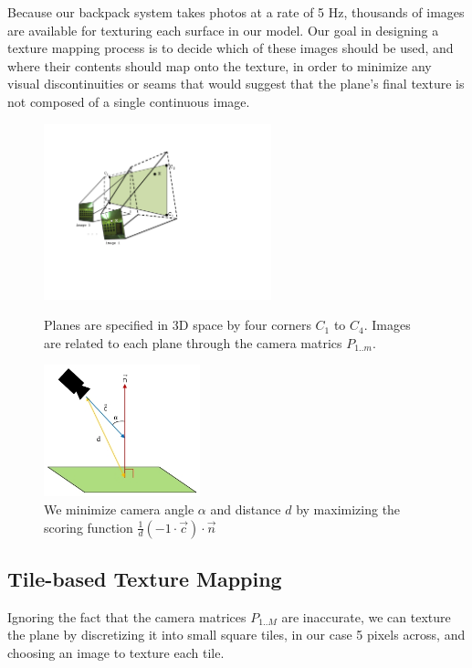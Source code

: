 \documentclass[]{spie}  %
\begin{document}
Because our backpack system takes photos at a rate of 5 Hz, thousands
of images are available for texturing each surface in our model. Our
goal in designing a texture mapping process is to decide which of
these images should be used, and where their contents should map onto
the texture, in order to minimize any visual discontinuities or seams
that would suggest that the plane's final texture is not composed of a
single continuous image.

\begin{figure}
  \begin{minipage}[b]{0.45\linewidth}
  \centering
  \includegraphics[height=2in]{Projection.pdf}
  \caption{Planes are specified in 3D space by four corners $C_1$ to
    $C_4$. Images are related to each plane through the camera matrics
    $P_{1..m}$. }
  \label{fig:projection}
  \end{minipage}
  \hspace{0.5cm}
  \begin{minipage}[b]{0.45\linewidth}
  \centering
  \includegraphics[height=1.5in]{scoringFunction.jpg}
  \caption{We minimize camera angle $\alpha$ and distance $d$ by
    maximizing the scoring function $\frac{1}{d} (-1 \cdot \vec{c})
    \cdot \vec{n}$}
  \label{fig:scoringFunction}
  \end{minipage}
\end{figure}


\subsection{Tile-based Texture Mapping}
\label{sec:tileBasedMapping}
Ignoring the fact that the camera matrices $P_{1..M}$ are inaccurate,
we can texture the plane by discretizing it into small square tiles,
in our case 5 pixels across, and choosing an image to texture each
tile.
\end{document}

